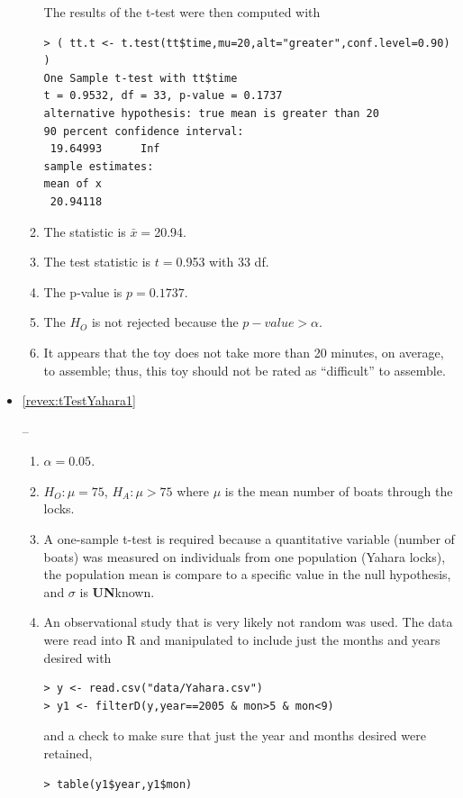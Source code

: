 \documentclass[10pt,openany]{book}\usepackage[]{graphicx}\usepackage[]{color}
\makeatletter
\newenvironment{kframe}{%
 \def\at@end@of@kframe{}%
 \ifinner\ifhmode%
  \def\at@end@of@kframe{\end{minipage}}%
  \begin{minipage}{\columnwidth}%
 \fi\fi%
 \def\FrameCommand##1{\hskip\@totalleftmargin \hskip-\fboxsep
 \colorbox{shadecolor}{##1}\hskip-\fboxsep
     \hskip-\linewidth \hskip-\@totalleftmargin \hskip\columnwidth}%
 \MakeFramed {\advance\hsize-\width
   \@totalleftmargin\z@ \linewidth\hsize
   \@setminipage}}%
 {\par\unskip\endMakeFramed%
 \at@end@of@kframe}
\newenvironment{knitrout}{}{} %
\makeatother
\begin{document}
\begin{itemize}
\begin{enumerate}
\begin{knitrout}
\end{knitrout}
The results of the t-test were then computed with
\begin{knitrout}
\color{fgcolor}\begin{kframe}
\begin{verbatim}
> ( tt.t <- t.test(tt$time,mu=20,alt="greater",conf.level=0.90) )
One Sample t-test with tt$time 
t = 0.9532, df = 33, p-value = 0.1737
alternative hypothesis: true mean is greater than 20 
90 percent confidence interval:
 19.64993      Inf 
sample estimates:
mean of x 
 20.94118 
\end{verbatim}
\end{kframe}
\end{knitrout}
      \item The statistic is $\bar{x}=$20.94.
      \item The test statistic is $t=$0.953 with 33 df.
      \item The p-value is $p=0.1737$.
      \item The $H_{O}$ is not rejected because the $p-value>\alpha$.
      \item It appears that the toy does not take more than 20 minutes, on average, to assemble; thus, this toy should not be rated as ``difficult'' to assemble.
    \end{enumerate}
  \item \hypertarget{ans:tTestYahara1}{\ref{revex:tTestYahara1}} --
    \begin{enumerate}
      \item $\alpha=0.05$.
      \item $H_{O}:\mu=75$, $H_{A}:\mu>75$ where $\mu$ is the mean number of boats through the locks.
      \item A one-sample t-test is required because a quantitative variable (number of boats) was measured on individuals from one population (Yahara locks), the population mean is compare to a specific value in the null hypothesis, and $\sigma$ is \textbf{UN}known.
      \item An observational study that is very likely not random was used.  The data were read into R and manipulated to include just the months and years desired with
\begin{knitrout}
\color{fgcolor}\begin{kframe}
\begin{verbatim}
> y <- read.csv("data/Yahara.csv")
> y1 <- filterD(y,year==2005 & mon>5 & mon<9)
\end{verbatim}
\end{kframe}
\end{knitrout}
and a check to make sure that just the year and months desired were retained,
\begin{knitrout}
\color{fgcolor}\begin{kframe}
\begin{verbatim}
> table(y1$year,y1$mon)
      

\end{verbatim}
\end{kframe}
\end{knitrout}
\end{enumerate}
\end{itemize}
\end{document}

